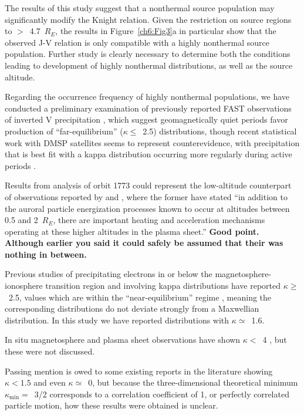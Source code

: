   The results of this study suggest that a nonthermal source population may
  significantly modify the Knight relation. Given the restriction on source
  regions to $>$~4.7~$R_E$, the results in Figure~\ref{ch6:Fig3}a in particular
  show that the observed J-V relation is only compatible with a highly
  nonthermal source population. Further study is clearly necessary to determine
  both the conditions leading to development of highly nonthermal distributions,
  as well as the source altitude.

  Regarding the occurrence frequency of highly nonthermal populations, we have
  conducted a preliminary examination of previously reported FAST observations
  of inverted V precipitation
  \citep{McFadden1998a,Carlson2001,Janhunen2001,Dombeck2013}, which suggest
  geomagnetically quiet periods favor production of ``far-equilibrium'' ($\kappa
  \leq$~2.5) distributions, though recent statistical work with DMSP satellites
  seems to represent counterevidence, with precipitation that is best fit with a
  kappa distribution occurring more regularly during active periods \citep[e.g.,
  Figure~7 in][]{McIntosh2014}.

  Results from analysis of orbit 1773 could represent the low-altitude
  counterpart of observations reported by \citet{Wygant2002} and
  \citet{Schriver2003}, where the former have stated ``in addition to the
  auroral particle energization processes known to occur at altitudes between
  0.5 and 2~$R_E$, there are important heating and acceleration mechanisms
  operating at these higher altitudes in the plasma sheet.'' \textbf{Good
    point. Although earlier you said it could safely be assumed that their was
    nothing in between.}

  Previous studies of precipitating electrons in or below the
  magnetosphere-ionosphere transition region and involving kappa distributions
  \citep{Olsson1998,Ogasawara2006,Kaeppler2014a} have reported $\kappa
  \geq$~2.5, values which are within the ``near-equilibrium'' regime
  \citep{Livadiotis2010}, meaning the corresponding distributions do not deviate
  strongly from a Maxwellian distribution. In this study we have reported
  distributions with $\kappa \simeq$~1.6.

  In situ magnetosphere and plasma sheet observations
  \citet{Christon1989,Christon1991,Kletzing2003} have shown $\kappa <$~4 , but
  these were not discussed.

  Passing mention is owed to some existing reports in the literature showing
  $\kappa < 1.5$ and even $\kappa \simeq$~0, but because the three-dimensional
  theoretical minimum $\kappa_{\mathrm{min}} =$~3/2 corresponds to a correlation
  coefficient of 1, or perfectly correlated particle motion, how these results
  were obtained is unclear.

